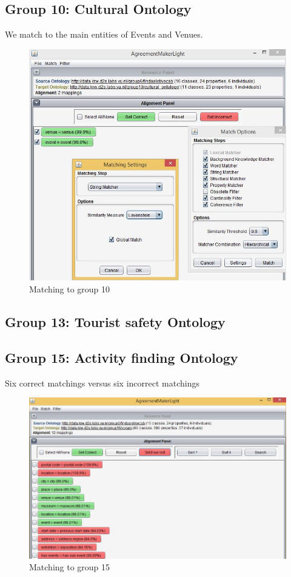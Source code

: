 \documentclass[runningheads,a4paper]{../../StyleFiles/llncs}
\begin{document}
\subsection{Group 10: Cultural Ontology}
We match to the main entities of Events and Venues.

\begin{figure}[h]\centering
	\includegraphics[width=.75\textwidth]{img/match_g10.png}
	\caption{Matching to group 10}
	\label{fig:match_g10}
\end{figure}

\subsection{Group 13: Tourist safety Ontology}


\subsection{Group 15: Activity finding Ontology}
Six correct matchings versus six incorrect matchings

\begin{figure}[h]\centering
	\includegraphics[width=.75\textwidth]{img/match_g15.png}
	\caption{Matching to group 15}
	\label{fig:match_g15}
\end{figure}
\end{document}
